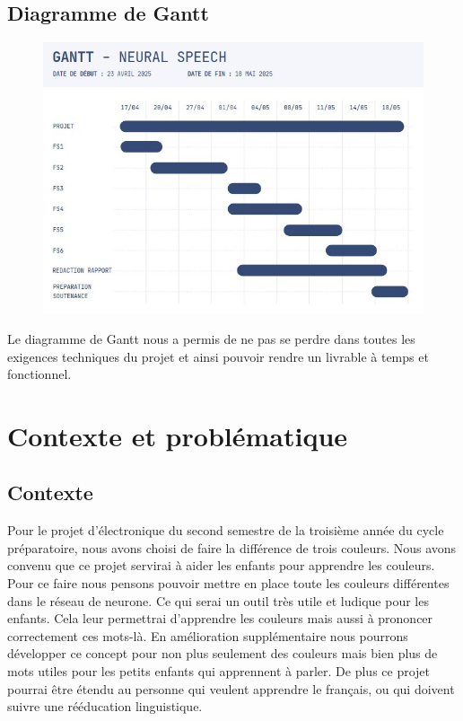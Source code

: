 \documentclass[a4paper,11pt]{article}
\begin{document}
\subsection{Diagramme de Gantt}
\begin{figure}[H]
\centering
\includegraphics[scale=0.6]{images/gantt2.jpg}
\end{figure}
Le diagramme de Gantt nous a permis de ne pas se perdre dans toutes les exigences techniques du projet et ainsi pouvoir rendre un livrable à temps et fonctionnel.

\section{Contexte et problématique}
\subsection{Contexte}
Pour le projet d'électronique du second semestre de la troisième année du cycle préparatoire, nous avons choisi de faire la différence de trois couleurs. Nous avons convenu que ce projet servirai à aider les enfants pour apprendre les couleurs. Pour ce faire nous pensons pouvoir mettre en place toute les couleurs différentes dans le réseau de neurone. Ce qui serai un outil très utile et ludique pour les enfants. Cela leur permettrai d’apprendre les couleurs mais aussi à prononcer correctement ces mots-là.  En amélioration supplémentaire nous pourrons développer ce concept pour non plus seulement des couleurs mais bien plus de mots utiles pour les petits enfants qui apprennent à parler.  De plus ce projet pourrai être étendu au personne qui veulent apprendre le français, ou qui doivent suivre une rééducation linguistique.
\end{document}
